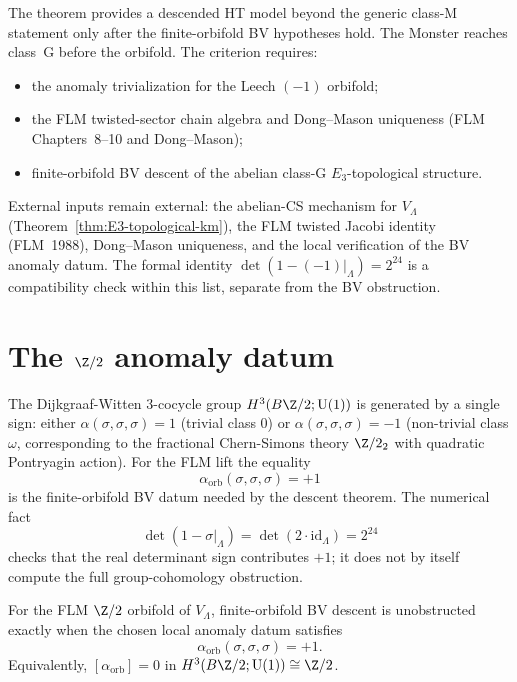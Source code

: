 \begin{remark}
\label{rem:monster-orbifold-scope}
The theorem provides a descended HT model beyond the generic class-M
statement only after the finite-orbifold BV hypotheses hold. The
Monster reaches class~G before the orbifold. The criterion requires:
\begin{itemize}
\item the anomaly trivialization for the Leech $(-1)$ orbifold;
\item the FLM twisted-sector chain algebra and Dong--Mason uniqueness
 (FLM Chapters~8--10 and Dong--Mason);
\item finite-orbifold BV descent of the abelian class-G
 $E_3$-topological structure.
\end{itemize}
External inputs remain external: the abelian-CS mechanism for
$V_\Lambda$ (Theorem~\ref*{thm:E3-topological-km}), the FLM twisted
Jacobi identity (FLM~1988), Dong--Mason uniqueness, and the local
verification of the BV anomaly datum. The formal
identity $\det(1-(-1)|_\Lambda)=2^{24}$ is a compatibility check
within this list, separate from the BV obstruction.
\end{remark}

\section{The $\Z/2$ anomaly datum}
\label{sec:monster-anomaly-class-explicit}

The Dijkgraaf-Witten 3-cocycle group $H^3(B\Z/2;\mathrm{U}(1))$ is
generated by a single sign: either $\alpha(\sigma,\sigma,\sigma) = 1$
(trivial class $0$) or $\alpha(\sigma,\sigma,\sigma) = -1$
(non-trivial class $\omega$, corresponding to the fractional
Chern-Simons theory $\Z/2_2$ with quadratic Pontryagin action).
For the FLM lift the equality
\[
 \alpha_{\mathrm{orb}}(\sigma,\sigma,\sigma)=+1
\]
is the finite-orbifold BV datum needed by the descent theorem. The
numerical fact
\[
 \det(1-\sigma|_\Lambda)=\det(2\cdot\mathrm{id}_\Lambda)=2^{24}
\]
checks that the real determinant sign contributes $+1$; it does not
by itself compute the full group-cohomology obstruction.

\begin{proposition}
\label{prop:monster-alpha-explicit-zero}
For the FLM $\Z/2$ orbifold of $V_\Lambda$, finite-orbifold BV
descent is unobstructed exactly when the chosen local anomaly datum
satisfies
\[
 \alpha_{\mathrm{orb}}(\sigma,\sigma,\sigma)=+1.
\]
Equivalently, $[\alpha_{\mathrm{orb}}]=0$ in
$H^3(B\Z/2;\mathrm{U}(1))\cong\Z/2$.
\end{proposition}

